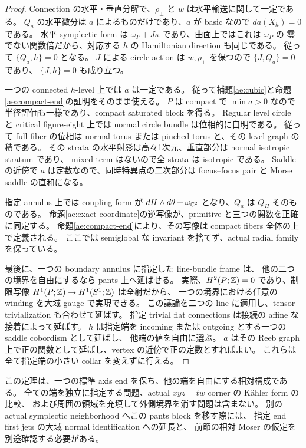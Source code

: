 \begin{proof}
Connection の水平・垂直分解で、$\rho_\pm$ と $w$ は水平輸送に関して一定である。
$Q_a$ の水平微分は $a$ によるものだけであり、$a$ が basic なので
$da(X_h)=0$ である。
水平 symplectic form は $\omega_P+J\kappa$ であり、曲面上ではこれは $\omega_P$ の
零でない関数倍だから、対応する $h$ の Hamiltonian direction も同じである。
従って $\{Q_a,h\}=0$ となる。
$J$ による circle action は $w,\rho_\pm$ を保つので $\{J,Q_a\}=0$ であり、
$\{J,h\}=0$ も成り立つ。

一つの connected $h$-level 上では $a$ は一定である。
従って補題\ref{ae:cubic}と命題\ref{ae:compact-end}の証明をそのまま使える。
$P$ は compact で $\min a>0$ なので半径評価も一様であり、compact saturated block を得る。
Regular level circle と critical figure-eight 上では normal circle bundle は位相的に自明である。
従って full fiber の位相は normal torus または pinched torus と、その level graph の積である。
その strata の水平射影は高々1次元、垂直部分は normal isotropic stratum であり、
mixed term はないので全 strata は isotropic である。
Saddle の近傍で $a$ は定数なので、同時特異点の二次部分は
focus--focus pair と Morse saddle の直和になる。

指定 annulus 上では coupling form が
$dH\wedge d\theta+\omega_{\mathbb C^2}$ となり、$Q_a$ は $Q_H$ そのものである。
命題\ref{ae:exact-coordinate}の逆写像が、primitive と三つの関数を正確に同定する。
命題\ref{ae:compact-end}により、その写像は compact fibers 全体の上で定義される。
ここでは semiglobal な invariant を捨てず、actual radial family を保っている。

最後に、一つの boundary annulus に指定した line-bundle frame は、
他の二つの境界を自由にするなら pants 上へ延ばせる。
実際、$H^2(P;\mathbb Z)=0$ であり、制限写像
$H^1(P;\mathbb Z)\to H^1(S^1;\mathbb Z)$ は全射だから、
一つの境界における任意の winding を大域 gauge で実現できる。
この議論を二つの line に適用し、tensor trivialization も合わせて延ばす。
指定 trivial flat connections は接続の affine な接着によって延ばす。
$h$ は指定端を incoming または outgoing とする一つの saddle cobordism として延ばし、
他端の値を自由に選ぶ。
$a$ はその Reeb graph 上で正の関数として延ばし、vertex の近傍で正の定数とすればよい。
これらは全て指定端の小さい collar を変えずに行える。
\end{proof}

\begin{remark}\label{ae:one-end-limit}
この定理は、一つの標準 axis end を保ち、他の端を自由にする相対構成である。
全ての端を独立に指定する問題、actual $xyz=tw$ corner の Kähler form の比較、
および周囲の領域を充填して外側境界を消す問題は含まない。
別の actual symplectic neighborhood へこの pants block を移す際には、
指定 end first jets の大域 normal identification への延長と、
前節の相対 Moser の仮定を別途確認する必要がある。
\end{remark}


